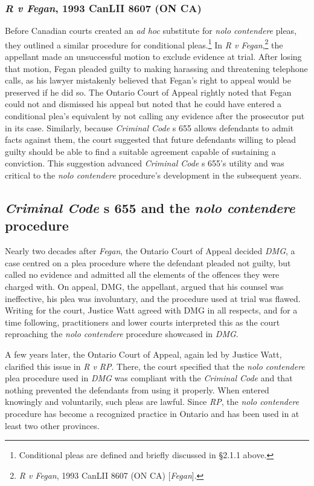\subsubsection{\textit{R v Fegan}, 1993 CanLII 8607 (ON CA)}

Before Canadian courts created an \textit{ad hoc} substitute for \textit{nolo contendere} pleas, they outlined a similar procedure for conditional pleas.\footnote{Conditional pleas are defined and briefly discussed in \S 2.1.1 above.} In \textit{R v Fegan},\footnote{\textit{R v Fegan}, 1993 CanLII 8607 (ON CA) [\textit{Fegan}].} the appellant made an unsuccessful motion to exclude evidence at trial. After losing that motion, Fegan pleaded guilty to making harassing and threatening telephone calls, as his lawyer mistakenly believed that Fegan's right to appeal would be preserved if he did so. The Ontario Court of Appeal rightly noted that Fegan could not and dismissed his appeal but noted that he could have entered a conditional plea's equivalent by not calling any evidence after the prosecutor put in its case. Similarly, because \textit{Criminal Code} s 655 allows defendants to admit facts against them, the court suggested that future defendants willing to plead guilty should be able to find a suitable agreement capable of sustaining a conviction. This suggestion advanced \textit{Criminal Code} s 655's utility and was critical to the \textit{nolo contendere} procedure's development in the subsequent years.

\subsection{\textit{Criminal Code} s 655 and the \textit{nolo contendere} procedure}

Nearly two decades after \textit{Fegan}, the Ontario Court of Appeal decided \textit{DMG}, a case centred on a plea procedure where the defendant pleaded not guilty, but called no evidence and admitted all the elements of the offences they were charged with. On appeal, DMG, the appellant, argued that his counsel was ineffective, his plea was involuntary, and the procedure used at trial was flawed. Writing for the court, Justice Watt agreed with DMG in all respects, and for a time following, practitioners and lower courts interpreted this as the court reproaching the \textit{nolo contendere} procedure showcased in \textit{DMG}.

A few years later, the Ontario Court of Appeal, again led by Justice Watt, clarified this issue in \textit{R v RP}. There, the court specified that the \textit{nolo contendere} plea procedure used in \textit{DMG} was compliant with the \textit{Criminal Code} and that nothing prevented the defendants from using it properly. When entered knowingly and voluntarily, such pleas are lawful. Since \textit{RP}, the \textit{nolo contendere} procedure has become a recognized practice in Ontario and has been used in at least two other provinces.

